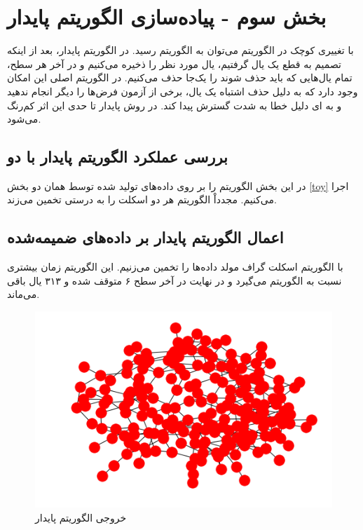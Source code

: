 \documentclass{article}
\begin{document}
\section{بخش سوم - پیاده‌سازی الگوریتم
پایدار
}
با تغییری کوچک در الگوریتم 
می‌توان به الگوریتم 
رسید. در الگوریتم پایدار، بعد از اینکه تصمیم به قطع یک یال گرفتیم، یال مورد نظر را ذخیره می‌کنیم و در آخر هر سطح، تمام یال‌هایی که باید حذف شوند را یک‌جا حذف می‌کنیم. در الگوریتم اصلی این امکان وجود دارد که به دلیل حذف اشتباه یک یال، برخی از آزمون فرض‌ها را دیگر انجام ندهید و به ای دلیل خطا به شدت گسترش پیدا کند. در روش پایدار تا حدی این اثر کم‌رنگ می‌شود.

\subsection{
بررسی عملکرد الگوریتم پایدار با دو 
}

در این بخش الگوریتم 
را بر روی داده‌های تولید شده توسط همان دو 
بخش \eqref{toy} اجرا می‌کنیم. مجدداْ‌ الگوریتم هر دو اسکلت را به درستی تخمین می‌زند.

\subsection{اعمال الگوریتم پایدار بر داده‌های ضمیمه‌شده}
با الگوریتم 
اسکلت گراف مولد داده‌ها را تخمین می‌زنیم. این الگوریتم زمان بیشتری نسبت به الگوریتم 
می‌گیرد و در نهایت در آخر سطح ۶ متوقف شده و ۳۱۳ یال باقی می‌ماند. 
\begin{figure}[h]
	\centering
	\includegraphics[scale=0.5]{stable.png}
	\caption{خروجی الگوریتم پایدار}
	\label{out2}
\end{figure}
\end{document}
